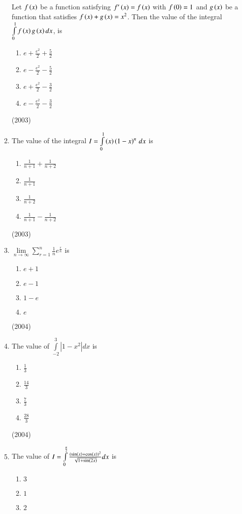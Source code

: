 \documentclass[journal,12pt,twocolumn]{IEEEtran}
\theoremstyle{remark}
\begin{document}
\begin{enumerate}
		Let $f\left(x\right)$ be a function satisfying $f'\left(x\right) = f\left(x\right)$ with $f\left(0\right)=1$ and $g\left(x\right)$ be a function that satisfies $f\left(x\right) + g\left(x\right)=x^2$. Then the value of the integral $\int \limits_0^1 f\left(x\right)g\left(x\right)dx$, is
			\begin {enumerate}
				\item $e+ \frac{e^2}{2} + \frac{5}{2}$
				\item $e- \frac{e^2}{2} - \frac{5}{2}$
				\item $e+ \frac{e^2}{2} - \frac{3}{2}$
				\item $e- \frac{e^2}{2} - \frac{3}{2}$
			\end {enumerate}
			\hfill (2003)
	\item
		The value of the integral $I = \int \limits_0^1 \left(x\right)\left(1-x\right)^n \, dx$ is
			\begin{enumerate}
				\item $\frac{1}{n+1} + \frac{1}{n+2}$
				\item $\frac{1}{n+1}$
				\item $\frac{1}{n+2}$
				\item $\frac{1}{n+1} - \frac{1}{n+2}$
			\end{enumerate}
			\hfill (2003)
	\item
		$\lim \limits_{n \to \infty} \sum \limits_{r=1}^{n} \frac{1}{n} e^{\frac{r}{n}}$ is
			\begin{enumerate}
				\item $e+1$
				\item $e-1$
				\item $1-e$
				\item $e$	
			\end{enumerate}
			\hfill (2004)
	\item 
		The value of $\int \limits_{-2}^{3} |1-x^2|dx$ is 
			\begin{enumerate}
				\item $\frac{1}{3}$
				\item $\frac{14}{3}$
				\item $\frac{7}{3}$
				\item $\frac{28}{3}$
			\end{enumerate}
			\hfill (2004)
	\item
		The value of $I = \int \limits_0^{\frac{\pi}{2}} \frac{(\sin \left(x\right) + \cos \left(x\right))^2}{\sqrt{1+ \sin \left(2x\right)}} dx$ is
			\begin{enumerate}
				\item $3$
				\item $1$
				\item $2$

\end{enumerate}
\end{enumerate}
\end{document}
